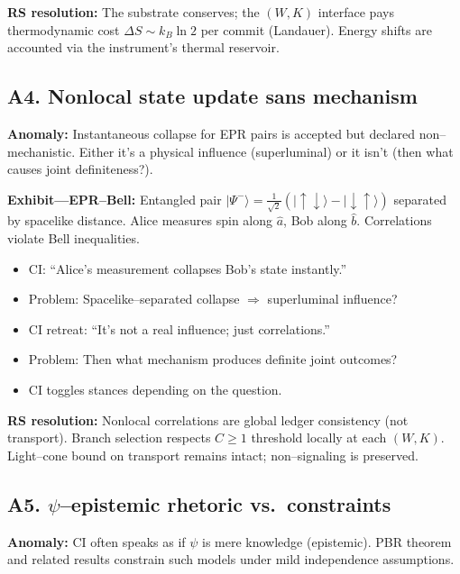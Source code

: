 \documentclass[11pt]{article}
\begin{document}
\textbf{RS resolution:} The substrate conserves; the $(W,K)$ interface pays thermodynamic cost $\Delta S \sim k_B\ln 2$ per commit (Landauer). Energy shifts are accounted via the instrument's thermal reservoir.

\subsection{A4. Nonlocal state update sans mechanism}

\begin{alertbox}
\textbf{Anomaly:} Instantaneous collapse for EPR pairs is accepted but declared non--mechanistic. Either it's a physical influence (superluminal) or it isn't (then what causes joint definiteness?).
\end{alertbox}

\textbf{Exhibit---EPR--Bell:}
Entangled pair $|\Psi^-\rangle=\tfrac{1}{\sqrt{2}}(|\uparrow\downarrow\rangle-|\downarrow\uparrow\rangle)$ separated by spacelike distance. Alice measures spin along $\hat{a}$, Bob along $\hat{b}$. Correlations violate Bell inequalities.

\begin{itemize}[nosep]
  \item CI: ``Alice's measurement collapses Bob's state instantly.''
  \item Problem: Spacelike--separated collapse $\Rightarrow$ superluminal influence?
  \item CI retreat: ``It's not a real influence; just correlations.''
  \item Problem: Then what mechanism produces definite joint outcomes?
  \item CI toggles stances depending on the question.
\end{itemize}

\textbf{RS resolution:} Nonlocal correlations are global ledger consistency (not transport). Branch selection respects $C\ge 1$ threshold locally at each $(W,K)$. Light--cone bound on transport remains intact; non--signaling is preserved.

\subsection{A5. $\psi$--epistemic rhetoric vs.\ constraints}

\begin{alertbox}
\textbf{Anomaly:} CI often speaks as if $\psi$ is mere knowledge (epistemic). PBR theorem and related results constrain such models under mild independence assumptions.
\end{alertbox}
\end{document}
